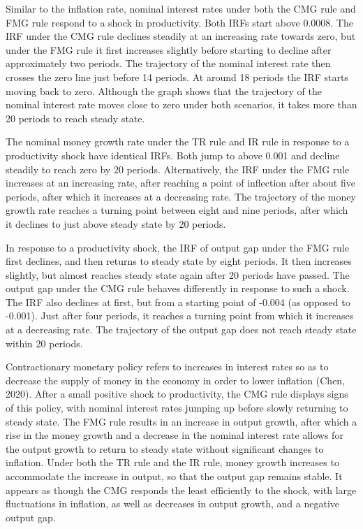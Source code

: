 \documentclass[11pt,preprint, authoryear]{elsarticle}
\numberwithin{equation}{section}
\numberwithin{figure}{section}
\numberwithin{table}{section}
\begin{document}
Similar to the inflation rate, nominal interest rates under both the CMG
rule and FMG rule respond to a shock in productivity. Both IRFs start
above 0.0008. The IRF under the CMG rule declines steadily at an
increasing rate towards zero, but under the FMG rule it first increases
slightly before starting to decline after approximately two periods. The
trajectory of the nominal interest rate then crosses the zero line just
before 14 periods. At around 18 periods the IRF starts moving back to
zero. Although the graph shows that the trajectory of the nominal
interest rate moves close to zero under both scenarios, it takes more
than 20 periods to reach steady state.

The nominal money growth rate under the TR rule and IR rule in response
to a productivity shock have identical IRFs. Both jump to above 0.001
and decline steadily to reach zero by 20 periods. Alternatively, the IRF
under the FMG rule increases at an increasing rate, after reaching a
point of inflection after about five periods, after which it increases
at a decreasing rate. The trajectory of the money growth rate reaches a
turning point between eight and nine periods, after which it declines to
just above steady state by 20 periods.

In response to a productivity shock, the IRF of output gap under the FMG
rule first declines, and then returns to steady state by eight periods.
It then increases slightly, but almost reaches steady state again after
20 periods have passed. The output gap under the CMG rule behaves
differently in response to such a shock. The IRF also declines at first,
but from a starting point of -0.004 (as opposed to -0.001). Just after
four periods, it reaches a turning point from which it increases at a
decreasing rate. The trajectory of the output gap does not reach steady
state within 20 periods.

Contractionary monetary policy refers to increases in interest rates so
as to decrease the supply of money in the economy in order to lower
inflation (Chen, 2020). After a small positive shock to productivity,
the CMG rule displays signs of this policy, with nominal interest rates
jumping up before slowly returning to steady state. The FMG rule results
in an increase in output growth, after which a rise in the money growth
and a decrease in the nominal interest rate allows for the output growth
to return to steady state without significant changes to inflation.
Under both the TR rule and the IR rule, money growth increases to
accommodate the increase in output, so that the output gap remains
stable. It appears as though the CMG responds the least efficiently to
the shock, with large fluctuations in inflation, as well as decreases in
output growth, and a negative output gap.
\end{document}

